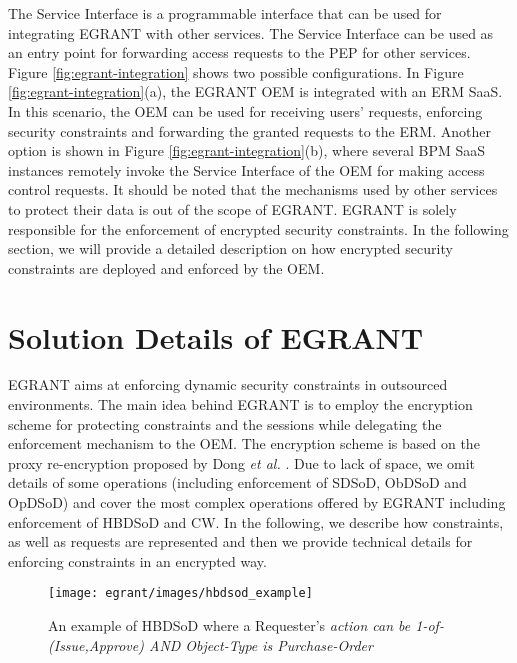 \documentclass[epsfig,a4paper,11pt,titlepage]{book}
\numberwithin{algorithm}{chapter}
\begin{document}
The Service Interface is a programmable interface that can be used for integrating \gls{EGRANT} with other services. The Service Interface can be used as an entry point for forwarding access requests to the \gls{PEP} for other services. Figure \ref{fig:egrant-integration} shows two possible configurations. In Figure \ref{fig:egrant-integration}(a), the \gls{EGRANT} \gls{OEM} is integrated with an \gls{ERM} \gls{SaaS}. In this scenario, the \gls{OEM} can be used for receiving users' requests, enforcing security constraints and forwarding the granted requests to the \gls{ERM}. Another option is shown in Figure \ref{fig:egrant-integration}(b), where several \gls{BPM} \gls{SaaS} instances remotely invoke the Service Interface of the \gls{OEM} for making access control requests. It should be noted that the mechanisms used by other services to protect their data is out of the scope of \gls{EGRANT}. \gls{EGRANT} is solely responsible for the enforcement of encrypted security constraints. In the following section, we will provide a detailed description on how encrypted security constraints are deployed and enforced by the \gls{OEM}.


\section[Solution Details of E-GRANT]{Solution Details of \gls{EGRANT}}
\label{sec:egrant-solution-details}

\gls{EGRANT} aims at enforcing dynamic security constraints in outsourced environments. The main idea behind \gls{EGRANT} is to employ the encryption scheme for protecting constraints and the sessions while delegating the enforcement mechanism to the \gls{OEM}. The encryption scheme is based on the proxy re-encryption proposed by Dong \emph{et al.} \cite{Dong:2011}. Due to lack of space, we omit details of some operations (including enforcement of S\gls{DSoD}, \gls{ObDSoD} and \gls{OpDSoD}) and cover the most complex operations offered by \gls{EGRANT} including enforcement of \gls{HBDSoD} and \gls{CW}. In the following, we describe how constraints, as well as requests are represented and then we provide technical details for enforcing constraints in an encrypted way.

\begin{figure} [htp]
\centering
\texttt{[image: egrant/images/hbdsod\_example]}
\caption[An example of History-Based Dynamic Separation of Duties]{An example of \gls{HBDSoD} where a Requester's \emph{action can be 1-of-(Issue,Approve) AND Object-Type is Purchase-Order}}
\label{fig:egrant-hbdsod_example}
\end{figure}
\end{document}
